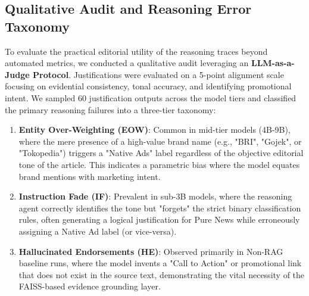 \documentclass{ieeeaccess}
\begin{document}
\subsection{Qualitative Audit and Reasoning Error Taxonomy}
To evaluate the practical editorial utility of the reasoning traces beyond automated metrics, we conducted a qualitative audit leveraging an \textbf{LLM-as-a-Judge Protocol}. Justifications were evaluated on a 5-point alignment scale focusing on evidential consistency, tonal accuracy, and identifying promotional intent. We sampled 60 justification outputs across the model tiers and classified the primary reasoning failures into a three-tier taxonomy:
\begin{enumerate}
    \item \textbf{Entity Over-Weighting (EOW)}: Common in mid-tier models (4B-9B), where the mere presence of a high-value brand name (e.g., "BRI", "Gojek", or "Tokopedia") triggers a "Native Ads" label regardless of the objective editorial tone of the article. This indicates a parametric bias where the model equates brand mentions with marketing intent.
    \item \textbf{Instruction Fade (IF)}: Prevalent in sub-3B models, where the reasoning agent correctly identifies the tone but "forgets" the strict binary classification rules, often generating a logical justification for Pure News while erroneously assigning a Native Ad label (or vice-versa).
    \item \textbf{Hallucinated Endorsements (HE)}: Observed primarily in Non-RAG baseline runs, where the model invents a "Call to Action" or promotional link that does not exist in the source text, demonstrating the vital necessity of the FAISS-based evidence grounding layer.
\end{enumerate}
\end{document}
